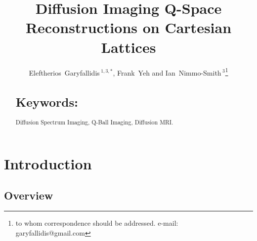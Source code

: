 \documentclass{bioinfo}
\begin{document}

\title[EIT]{Diffusion Imaging Q-Space Reconstructions on Cartesian Lattices}

\author[Garyfallidis, Yeh and
Nimmo-Smith]{Eleftherios~Garyfallidis\,$^{1,3,*}$, Frank~Yeh and
  Ian~Nimmo-Smith\,$^{3}$\footnote{to whom correspondence should be
    addressed. e-mail: garyfallidis@gmail.com}}

\address{\,$^{1}$Wolfson College, University of Cambridge, Cambridge, UK\\
  \,$^{3}$MRC Cognition and Brain Sciences Unit, Cambridge, UK.\\}


\history{}

\editor{}

\maketitle

\begin{abstract}
\noindent

\section{Keywords:} Diffusion Spectrum Imaging, Q-Ball Imaging, Diffusion MRI.

\end{abstract}


\section{Introduction}

\subsection{Overview}
\end{document}
